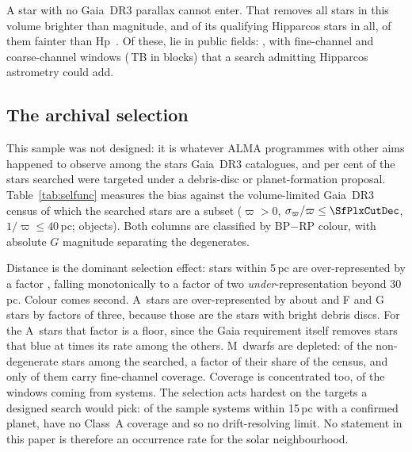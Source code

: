 A star with no Gaia~DR3 parallax cannot enter. That removes all \BsNBright{}
stars in this volume brighter than \BsBrightMag{} magnitude, and \BsNGap{} of
its \BsNVol{} qualifying Hipparcos stars in all, \BsGapNFaint{} of them
fainter than Hp~\BsGapMagCut. Of these, \BsNAlmaWord{} lie in public fields:
\BsStarList, with \BsNWinA{} fine-channel and \BsNWinB{} coarse-channel windows
(\BsRawTB\,TB in \BsNEB{} blocks) that a search admitting Hipparcos astrometry
could add.


\subsection{The archival selection}
\label{sec:bias}

This sample was not designed: it is whatever ALMA programmes with other aims
happened to observe among the stars Gaia~DR3 catalogues, and \PctDiscProposal{} per cent
of the stars searched were targeted under a debris-disc or planet-formation
proposal. Table~\ref{tab:selfunc} measures the bias against the volume-limited
Gaia~DR3 census of which the searched stars are a subset ($\varpi>0$,
$\sigma_\varpi/\varpi\le\SfPlxCutDec$, $1/\varpi\le40$\,pc; \SfCensusN{}
objects). Both columns are classified by BP$-$RP colour, with absolute $G$
magnitude separating the degenerates.

Distance is the dominant selection effect: stars within 5\,pc are
over-represented by a factor \SfTopRatio, falling monotonically to a factor of
two \emph{under}-representation beyond 30\,pc. Colour comes second. A~stars are
over-represented by about \SfARatio{} and F and G stars by factors of three,
because those are the stars with bright debris discs. For the A~stars that
factor is a floor, since the Gaia requirement itself removes stars that blue
at \BsEarlyRatio{} times its rate among the others. M~dwarfs are depleted:
\SfMSearched{} of the \SfNMain{} non-degenerate stars among the \SfNStar{} searched, a factor \SfMRatio{} of their
share of the census, and only \SfMClassAStars{} of them carry fine-channel
coverage. Coverage is concentrated too, \ConcThreeWin{} of the \NWindows{}
windows coming from \ConcThreeSys{} systems. The selection acts hardest on the
targets a designed search would pick: of the \CsIntNRow{} sample systems within
15\,pc with a confirmed planet, \CsIntNoClassA{} have no Class~A coverage and so
no drift-resolving limit. No statement in this paper is therefore an
occurrence rate for the solar neighbourhood.



